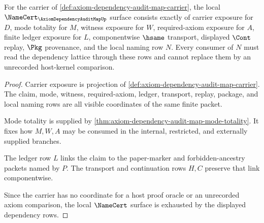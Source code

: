 \begin{theorem}
\label{thm:axiom-dependency-audit-map-namecert-obligations}
For the carrier of \autoref{def:axiom-dependency-audit-map-carrier}, the local $\NameCert_{\AxiomDependencyAuditMapUp}$ surface consists exactly of carrier exposure for $D$, mode totality for $M$, witness exposure for $W$, required-axiom exposure for $A$, finite ledger exposure for $L$, componentwise $\hsame$ transport, displayed $\Cont$ replay, $\Pkg$ provenance, and the local naming row $N$. Every consumer of $N$ must read the dependency lattice through these rows and cannot replace them by an unrecorded host-kernel comparison.
\end{theorem}
\begin{proof}
Carrier exposure is projection of \autoref{def:axiom-dependency-audit-map-carrier}. The claim, mode, witness, required-axiom, ledger, transport, replay, package, and local naming rows are all visible coordinates of the same finite packet.

Mode totality is supplied by \autoref{thm:axiom-dependency-audit-map-mode-totality}. It fixes how $M,W,A$ may be consumed in the internal, restricted, and externally supplied branches.

The ledger row $L$ links the claim to the paper-marker and forbidden-ancestry packets named by $P$. The transport and continuation rows $H,C$ preserve that link componentwise.

Since the carrier has no coordinate for a host proof oracle or an unrecorded axiom comparison, the local $\NameCert$ surface is exhausted by the displayed dependency rows.
\end{proof}


